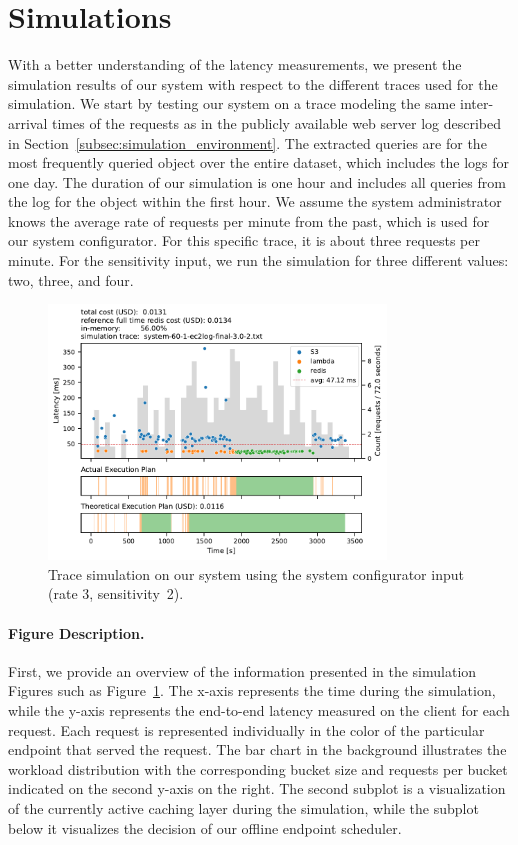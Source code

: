 \section{Simulations}
\label{subsec:performance_evaluation}
With a better understanding of the latency measurements, we present the simulation results of our system with respect to the different traces used for the simulation. We start by testing our system on a trace modeling the same inter-arrival times of the requests as in the publicly available web server log described in Section~\ref{subsec:simulation_environment}. The extracted queries are for the most frequently queried object over the entire dataset, which includes the logs for one day. The duration of our simulation is one hour and includes all queries from the log for the object within the first hour. We assume the system administrator knows the average rate of requests per minute from the past, which is used for our system configurator. For this specific trace, it is about three requests per minute. For the sensitivity input, we run the simulation for three different values: two, three, and four.
\begin{figure}[t]
    \begin{center}
        \includegraphics[width=0.8\textwidth]{figures/system-60-1-ec2log-final-3.0-2.pdf}
        \caption{Trace simulation on our system using the system configurator input (rate 3, sensitivity~2).}
        \label{fig:ec2log_3_2}
    \end{center}
\end{figure}

\paragraph{Figure Description.}
First, we provide an overview of the information presented in the simulation Figures such as Figure~\ref{fig:ec2log_3_2}. The x-axis represents the time during the simulation, while the y-axis represents the end-to-end latency measured on the client for each request. Each request is represented individually in the color of the particular endpoint that served the request. The bar chart in the background illustrates the workload distribution with the corresponding bucket size and requests per bucket indicated on the second y-axis on the right. The second subplot is a visualization of the currently active caching layer during the simulation, while the subplot below it visualizes the decision of our offline endpoint scheduler.


